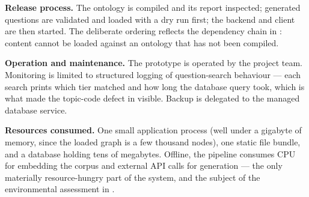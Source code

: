 \textbf{Release process.} The ontology is compiled and its report inspected;
generated questions are validated and loaded with a dry run first; the backend
and client are then started. The deliberate ordering reflects the dependency
chain in : content cannot be loaded against an ontology
that has not been compiled.

\textbf{Operation and maintenance.} The prototype is operated by the project
team. Monitoring is limited to structured logging of question-search behaviour
--- each search prints which tier matched and how long the database query took,
which is what made the topic-code defect in  visible.
Backup is delegated to the managed database service.

\textbf{Resources consumed.} One small application process (well under a
gigabyte of memory, since the loaded graph is a few thousand nodes), one static
file bundle, and a database holding tens of megabytes. Offline, the pipeline
consumes CPU for embedding the corpus and external API calls for generation ---
the only materially resource-hungry part of the system, and the subject of the
environmental assessment in .
